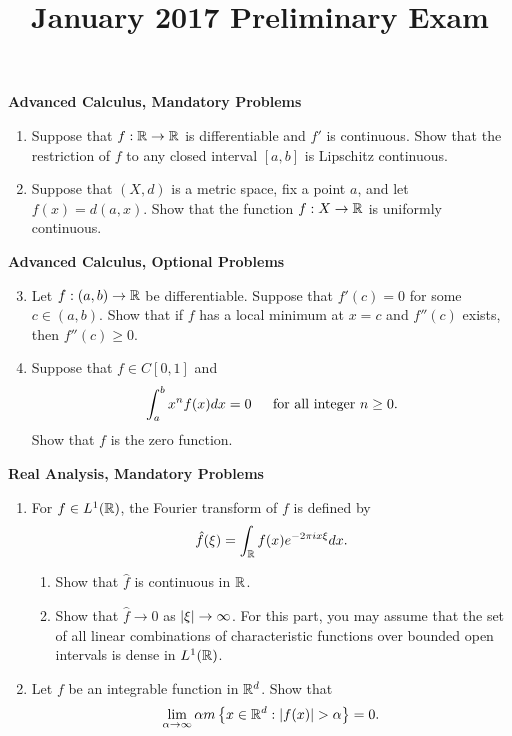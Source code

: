 \documentclass[11pt,twoside]{amsart}
\title{January 2017 Preliminary Exam}
\author{}
\theoremstyle{plain}
\begin{document}
\maketitle

\begin{center}
{\bf\Large Advanced Calculus, Mandatory Problems}
\end{center}

\begin{enumerate}
    \item Suppose that $f:\mathbb{R} \rightarrow \mathbb{R}$ is differentiable and $f'$ is continuous.
    Show that the restriction of $f$ to any closed interval $[a,b]$ is Lipschitz continuous.
    \vspace{12pt}
    \item Suppose that $(X,d)$ is a metric space, fix a point $a$, and let $f(x) = d(a,x)$.
    Show that the function $f: X \rightarrow \mathbb{R}$ is uniformly continuous.
\end{enumerate}
\vspace{12pt}
\begin{center}
{\bf\Large Advanced Calculus, Optional Problems}
\end{center}

\begin{enumerate}
    \setcounter{enumi}{2}
    \item Let $f:(a,b) \to \mathbb{R}$ be differentiable.
    Suppose that $f'(c) = 0$ for some $c\in (a,b)$.
    Show that if $f$ has a local minimum at $x=c$ and $f''(c)$ exists, then $f''(c) \geq 0$.
    \vspace{12pt}
    \item Suppose that $f\in C[0,1]$ and 
    \[
        \int_a^b{x^nf(x)dx} = 0 \textrm{\hspace{12pt} for all integer } n\geq 0.
    \]
    Show that $f$ is the zero function.
\end{enumerate}
\newpage

\begin{center}
{\bf\Large Real Analysis, Mandatory Problems}
\end{center}
\setcounter{enumi}{0}
\begin{enumerate}
    \item For $f \in L^1(\mathbb{R})$, the Fourier transform of $f$ is defined by
    \[
        \hat{f}(\xi) = \int_{\mathbb{R}}{f(x)e^{-2\pi ix\xi}dx}.
    \]
    \vspace{12pt}
    \begin{enumerate}
    \item Show that $\hat{f}$ is continuous in $\mathbb{R}$.
    \item Show that $\hat{f} \rightarrow 0$ as $\left| \xi \right| \rightarrow \infty$.
    For this part, you may assume that the set of all linear combinations of characteristic functions over bounded open intervals is dense in $L^1(\mathbb{R})$.
    \end{enumerate}
    \vspace{12pt}
    \item Let $f$ be an integrable function in $\mathbb{R}^d$.
    Show that
    \[
        \lim_{\alpha\rightarrow\infty}{\alpha m\left\{x\in\R^d : \card{f(x)}>\alpha\right\}} = 0.
    \]
\end{enumerate}
\end{document}
